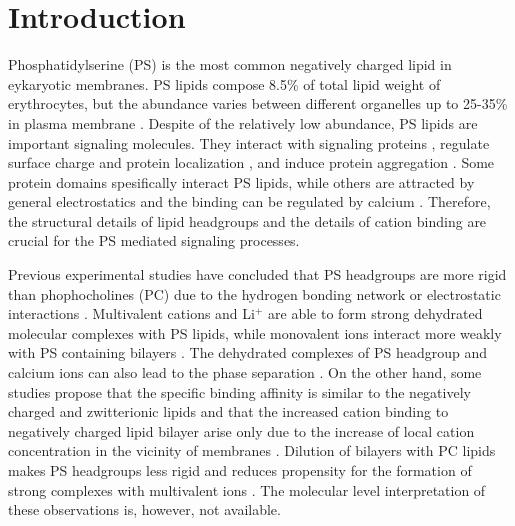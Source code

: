 \documentclass[aps,prl,superscriptaddress,twocolumn]{revtex4}
\begin{document}
\section{Introduction}
Phosphatidylserine (PS) is the most common negatively
charged lipid in eykaryotic membranes.
PS lipids compose 8.5\% of total lipid weight of erythrocytes,
but the abundance varies between different organelles up to
25-35\% in plasma membrane \cite{lemmon08,leventis10,li14}.
Despite of the relatively low abundance, PS lipids
are important signaling molecules. They interact with
signaling proteins \cite{leventis10}, regulate
surface charge and protein localization \cite{yeung08}, and
induce protein aggregation \cite{zhao04,gorbenko06}.
Some protein domains spesifically interact PS lipids,
while others are attracted by general electrostatics and the
binding can be regulated by calcium \cite{leventis10}.
Therefore, the structural details
of lipid headgroups and the details of cation binding
are crucial for the PS mediated signaling processes.

Previous experimental studies have concluded that
PS headgroups are more rigid than phophocholines (PC)
due to the hydrogen bonding network or
electrostatic interactions \cite{browning80,buldt81}.
Multivalent cations and Li$^+$ are able to form strong
dehydrated molecular complexes with PS lipids,
while monovalent ions interact more weakly with PS
containing bilayers \cite{hauser77,kurland79,eisenberg79,hauser83,dluhy83,hauser85,feigenson86,mattai89,roux90,roux91,boettcher11}.
The dehydrated complexes of PS headgroup and calcium ions can also lead to the
phase separation \cite{hauser77,kurland79,hauser85,feigenson86,mattai89,roux90,roux91}.
On the other hand, some studies propose that the specific binding
affinity is similar to the negatively charged and zwitterionic lipids and that
the increased cation binding to negatively charged lipid bilayer arise only due
to the increase of local cation concentration in the vicinity of membranes \cite{seelig90,sinn06}.
Dilution of bilayers with PC lipids makes PS headgroups
less rigid and reduces propensity for the formation of
strong complexes with multivalent ions \cite{browning80,buldt81,roux90,roux91}.
The molecular level interpretation of these observations is,
however, not available.
\end{document}

